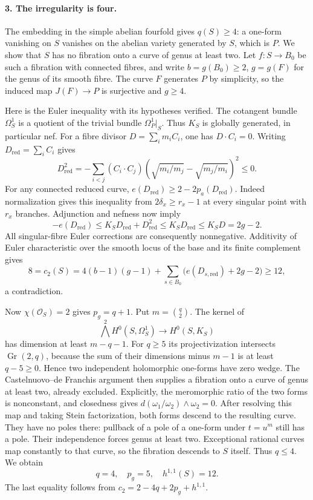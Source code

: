 \paragraph{3. The irregularity is four.}
The embedding in the simple abelian fourfold gives
$q(S)\geq4$: a one-form vanishing on $S$ vanishes on
the abelian variety generated by $S$, which is $P$.
We show that $S$ has no fibration onto a curve of genus
at least two. Let $f:S\to B_0$ be such a fibration with
connected fibres, and write $b=g(B_0)\geq2$, $g=g(F)$
for the genus of its smooth fibre. The curve $F$ generates
$P$ by simplicity, so the induced map $J(F)\to P$ is
surjective and $g\geq4$.

Here is the Euler inequality with its hypotheses verified.
The cotangent bundle $\Omega_S^1$ is a quotient of the
trivial bundle $\Omega_P^1|_S$. Thus $K_S$ is globally
generated, in particular nef. For a fibre divisor
$D=\sum_i m_iC_i$, one has $D\cdot C_i=0$. Writing
$D_{\mathrm{red}}=\sum_iC_i$ gives
\[
 D_{\mathrm{red}}^2
   =-\sum_{i<j}(C_i\cdot C_j)
       \left(\sqrt{m_i/m_j}-\sqrt{m_j/m_i}\right)^2\leq0.
\]
For any connected reduced curve,
$e(D_{\mathrm{red}})\geq2-2p_a(D_{\mathrm{red}})$.
Indeed normalization gives this inequality from
$2\delta_x\geq r_x-1$ at every singular point with
$r_x$ branches. Adjunction and nefness now imply
\[
 -e(D_{\mathrm{red}})
 \leq K_SD_{\mathrm{red}}+D_{\mathrm{red}}^2
 \leq K_SD_{\mathrm{red}}\leq K_SD=2g-2.
\]
All singular-fibre Euler corrections are consequently
nonnegative. Additivity of Euler characteristic over
the smooth locus of the base and its finite complement
gives
\[
 8=c_2(S)=4(b-1)(g-1)+
             \sum_{s\in B_0}\bigl(e(D_{s,\mathrm{red}})+2g-2\bigr)
       \geq12,
\]
a contradiction.

Now $\chi(\mathcal O_S)=2$ gives $p_g=q+1$. Put
$m=\binom q2$. The kernel of
\[
 \bigwedge^2H^0(S,\Omega_S^1)\longrightarrow H^0(S,K_S)
 \tag{F1S10.11}
\]
has dimension at least $m-q-1$. For $q\geq5$ its
projectivization intersects $\operatorname{Gr}(2,q)$,
because the sum of their dimensions minus $m-1$ is
at least $q-5\geq0$. Hence two independent holomorphic
one-forms have zero wedge. The Castelnuovo--de Franchis
argument then supplies a fibration onto a curve of
genus at least two, already excluded.
Explicitly, the meromorphic ratio of the two forms is
nonconstant, and closedness gives $d(\omega_1/\omega_2)
\wedge\omega_2=0$. After resolving this map and taking
Stein factorization, both forms descend to the resulting
curve. They have no poles there: pullback of a pole of
a one-form under $t=u^m$ still has a pole. Their independence
forces genus at least two. Exceptional rational curves
map constantly to that curve, so the fibration descends
to $S$ itself. Thus $q\leq4$.
We obtain
\[
                         q=4,\quad p_g=5,\quad h^{1,1}(S)=12.
 \tag{F1S10.12}
\]
The last equality follows from $c_2=2-4q+2p_g+h^{1,1}$.

